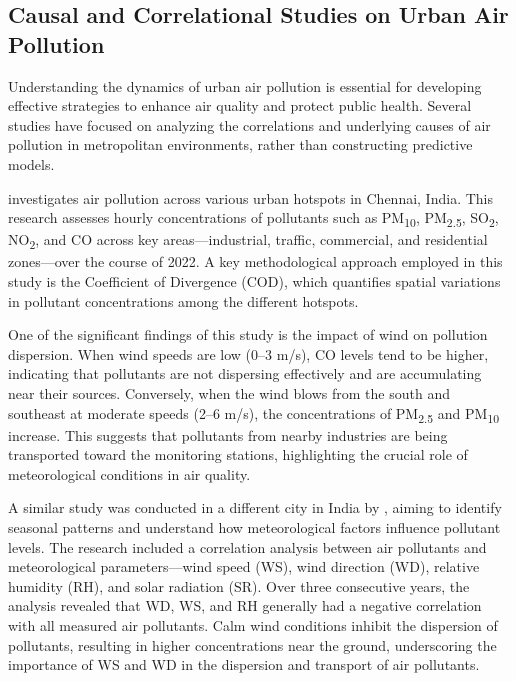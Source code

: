 \documentclass[twoside,11pt]{article}
\begin{document}
\subsection{Causal and Correlational Studies on Urban Air Pollution}

Understanding the dynamics of urban air pollution is essential for developing effective strategies to enhance air quality and protect public health. Several studies have focused on analyzing the correlations and underlying causes of air pollution in metropolitan environments, rather than constructing predictive models.

\citep{M2024AirQuality} investigates air pollution across various urban hotspots in Chennai, India. This research assesses hourly concentrations of pollutants such as PM\textsubscript{10}, PM\textsubscript{2.5}, SO\textsubscript{2}, NO\textsubscript{2}, and CO across key areas—industrial, traffic, commercial, and residential zones—over the course of 2022. A key methodological approach employed in this study is the Coefficient of Divergence (COD), which quantifies spatial variations in pollutant concentrations among the different hotspots.

One of the significant findings of this study is the impact of wind on pollution dispersion. When wind speeds are low (0–3 m/s), CO levels tend to be higher, indicating that pollutants are not dispersing effectively and are accumulating near their sources. Conversely, when the wind blows from the south and southeast at moderate speeds (2–6 m/s), the concentrations of PM\textsubscript{2.5} and PM\textsubscript{10} increase. This suggests that pollutants from nearby industries are being transported toward the monitoring stations, highlighting the crucial role of meteorological conditions in air quality.

A similar study was conducted in a different city in India by \citep{Suthar2024Annual}, aiming to identify seasonal patterns and understand how meteorological factors influence pollutant levels. The research included a correlation analysis between air pollutants and meteorological parameters—wind speed (WS), wind direction (WD), relative humidity (RH), and solar radiation (SR). Over three consecutive years, the analysis revealed that WD, WS, and RH generally had a negative correlation with all measured air pollutants. Calm wind conditions inhibit the dispersion of pollutants, resulting in higher concentrations near the ground, underscoring the importance of WS and WD in the dispersion and transport of air pollutants.
\end{document}
